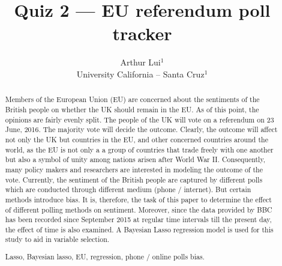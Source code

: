 \documentclass{../../tex_template/asaproc}
\title{Quiz 2 --- EU referendum poll tracker}
\author{
  Arthur Lui$^1$\\
  University California -- Santa Cruz$^1$\\
}
\begin{document}
\maketitle
\begin{abstract}
Members of the European Union (EU) are concerned about the sentiments of the
British people on whether the UK should remain in the EU. As of this point, the
opinions are fairly evenly split. The people of the UK will vote on a
referendum on 23 June, 2016. The majority vote will decide the outcome.
Clearly, the outcome will affect not only the UK but countries in the EU, and
other concerned countries around the world, as the EU is not only a a group of
countries that trade freely with one another but also a symbol of unity among
nations arisen after World War II. Consequently, many policy makers and
researchers are interested in modeling the outcome of the vote. Currently, the
sentiment of the British people are captured by different polls which are
conducted through different medium (phone / internet).  But certain methods
introduce bias. It is, therefore, the task of this paper to determine the
effect of different polling methods on sentiment. Moreover, since the data
provided by BBC has been recorded since September 2015 at regular time
intervals till the present day, the effect of time is also examined. A Bayesian
Lasso regression model is used for this study to aid in variable selection.
\begin{keywords}
Lasso, Bayesian lasso, EU, regression, phone / online polls bias.
\end{keywords}
\end{abstract}
\end{document}

